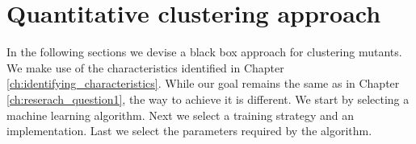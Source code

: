 \documentclass[../main]{subfiles}
\begin{document}
\chapter{Quantitative clustering approach}
\label{ch:reserach_question2}
In the following sections we devise a black box approach for clustering mutants.
We make use of the characteristics identified in Chapter \ref{ch:identifying_characteristics}.
While our goal remains the same as in Chapter \ref{ch:reserach_question1}, the way to achieve it is different.
We start by selecting a machine learning algorithm.
Next we select a training strategy and an implementation.
Last we select the parameters required by the algorithm.


\end{document}
